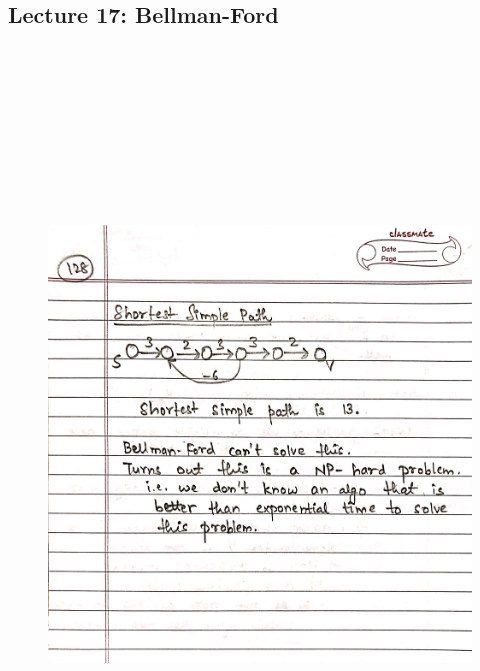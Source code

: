 \newpage
{\color{black} \subsection*{Lecture 17: Bellman-Ford}}
\begin{figure}[H]
    \centering
    \includegraphics[width=16cm, height=21cm]{"./MIT-6.006/MIT-6006-128"}
\end{figure}

